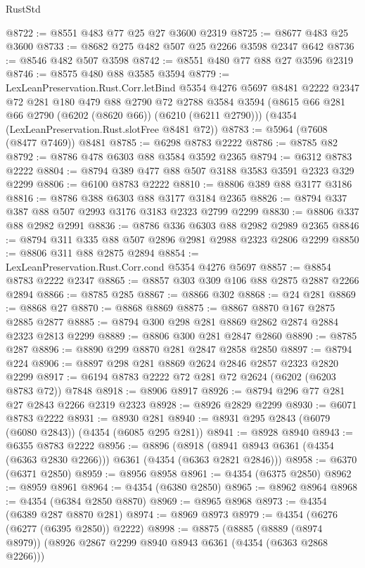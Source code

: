 \begin{lexlean}{RustStd}
\begin{coremodule}
@8722 := @8551 @483 @77 @25 @27 @3600 @2319
@8725 := @8677 @483 @25 @3600
@8733 := @8682 @275 @482 @507 @25 @2266 @3598 @2347 @642
@8736 := @8546 @482 @507 @3598
@8742 := @8551 @480 @77 @88 @27 @3596 @2319
@8746 := @8575 @480 @88 @3585 @3594
@8779 := LexLeanPreservation.Rust.Corr.letBind
    @5354
    @4276
    @5697
    @8481
    @2222
    @2347
    @72
    @281
    @180
    @479
    @88
    @2790
    @72
    @2788
    @3584
    @3594
    (@8615 @66 @281 @66 @2790 (@6202 (@8620 @66)) (@6210 (@6211 @2790)))
    (@4354 (LexLeanPreservation.Rust.slotFree @8481 @72))
@8783 := @5964 (@7608 (@8477 @7469)) @8481
@8785 := @6298 @8783 @2222
@8786 := @8785 @82
@8792 := @8786 @478 @6303 @88 @3584 @3592 @2365
@8794 := @6312 @8783 @2222
@8804 := @8794 @389 @477 @88 @507 @3188 @3583 @3591 @2323 @329 @2299
@8806 := @6100 @8783 @2222
@8810 := @8806 @389 @88 @3177 @3186
@8816 := @8786 @388 @6303 @88 @3177 @3184 @2365
@8826 := @8794 @337 @387 @88 @507 @2993 @3176 @3183 @2323 @2799 @2299
@8830 := @8806 @337 @88 @2982 @2991
@8836 := @8786 @336 @6303 @88 @2982 @2989 @2365
@8846 := @8794 @311 @335 @88 @507 @2896 @2981 @2988 @2323 @2806 @2299
@8850 := @8806 @311 @88 @2875 @2894
@8854 := LexLeanPreservation.Rust.Corr.cond @5354 @4276 @5697
@8857 := @8854 @8783 @2222 @2347
@8865 := @8857 @303 @309 @106 @88 @2875 @2887 @2266 @2894
@8866 := @8785 @285
@8867 := @8866 @302
@8868 := @24 @281
@8869 := @8868 @27
@8870 := @8868 @8869
@8875 := @8867 @8870 @167 @2875 @2885 @2877
@8885 := @8794 @300 @298 @281 @8869 @2862 @2874 @2884 @2323 @2813 @2299
@8889 := @8806 @300 @281 @2847 @2860
@8890 := @8785 @287
@8896 := @8890 @299 @8870 @281 @2847 @2858 @2850
@8897 := @8794 @224
@8906 := @8897 @298 @281 @8869 @2624 @2846 @2857 @2323 @2820 @2299
@8917 := @6194 @8783 @2222 @72 @281 @72 @2624 (@6202 (@6203 @8783 @72)) @7848
@8918 := @8906 @8917
@8926 := @8794 @296 @77 @281 @27 @2843 @2266 @2319 @2323
@8928 := @8926 @2829 @2299
@8930 := @6071 @8783 @2222
@8931 := @8930 @281
@8940 := @8931 @295 @2843 (@6079 (@6080 @2843)) (@4354 (@6085 @295 @281))
@8941 := @8928 @8940
@8943 := @6355 @8783 @2222
@8956 := @8896
    (@8918 (@8941 @8943 @6361 (@4354 (@6363 @2830 @2266))) @6361 (@4354 (@6363 @2821 @2846)))
@8958 := @6370 (@6371 @2850)
@8959 := @8956 @8958
@8961 := @4354 (@6375 @2850)
@8962 := @8959 @8961
@8964 := @4354 (@6380 @2850)
@8965 := @8962 @8964
@8968 := @4354 (@6384 @2850 @8870)
@8969 := @8965 @8968
@8973 := @4354 (@6389 @287 @8870 @281)
@8974 := @8969 @8973
@8979 := @4354 (@6276 (@6277 (@6395 @2850)) @2222)
@8998 := @8875
    (@8885
      (@8889 (@8974 @8979))
      (@8926 @2867 @2299 @8940 @8943 @6361 (@4354 (@6363 @2868 @2266)))

\end{coremodule}
\end{lexlean}
